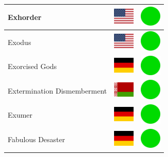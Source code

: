 \documentclass[12pt, a4paper, twoside]{report}
\begin{document}
\begin{center}
\begin{longtable}{|p{5cm}|p{2cm}|p{2cm}|}
 Exhorder                                                   & \includegraphics[width=1cm]{../4x3/us} &   \includegraphics[width=1cm]{../likes/y} \\ \hline
 Exodus                                                     & \includegraphics[width=1cm]{../4x3/us} &   \includegraphics[width=1cm]{../likes/y} \\ \hline
 Exorcised Gods                                             & \includegraphics[width=1cm]{../4x3/de} &   \includegraphics[width=1cm]{../likes/y} \\ \hline
 Extermination Dismemberment                                & \includegraphics[width=1cm]{../4x3/by} &   \includegraphics[width=1cm]{../likes/y} \\ \hline
 Exumer                                                     & \includegraphics[width=1cm]{../4x3/de} &   \includegraphics[width=1cm]{../likes/y} \\ \hline
 Fabulous Desaster                                          & \includegraphics[width=1cm]{../4x3/de} &   \includegraphics[width=1cm]{../likes/y} \\ \hline

\end{longtable}
\end{center}
\end{document}

